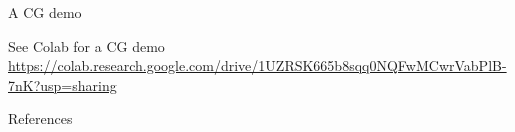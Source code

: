 \documentclass[9pt,aspectratio=169]{beamer}
\begin{document}
\begin{frame}{A CG demo}
\begin{center}
See Colab for a CG demo\\
 \url{https://colab.research.google.com/drive/1UZRSK665b8sqq0NQFwMCwrVabPlB-7nK?usp=sharing}
\end{center}
\end{frame}


\begin{frame}[allowframebreaks]{References}
%

  {\scriptsize}

\end{frame}
\end{document}
